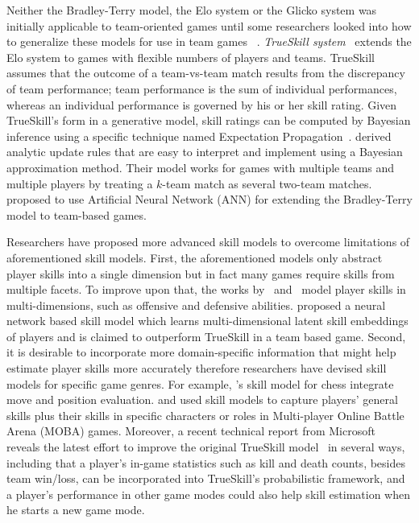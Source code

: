 Neither the Bradley-Terry model, the Elo system or the Glicko system was initially applicable to team-oriented games until some researchers looked into how to generalize these models for use in team games ~\citep{herbrich:trueskill,huang2004generalized,menke2008bradley}. \textit{TrueSkill system}~\citep{herbrich:trueskill} extends the Elo system to games with flexible numbers of players and teams. TrueSkill assumes that the outcome of a team-vs-team match results from the discrepancy of team performance; team performance is the sum of individual performances, whereas an individual performance is governed by his or her skill rating. Given TrueSkill's form in a generative model, skill ratings can be computed by Bayesian inference using a specific technique named Expectation Propagation~\citep{minka2001expectation}. \textcite{huang2004generalized} derived analytic update rules that are easy to interpret and implement using a Bayesian approximation
method. Their model works for games with multiple teams and multiple players by treating a $k$-team match as several two-team matches. \textcite{menke2008bradley} proposed to use Artificial Neural Network (ANN) for extending the Bradley-Terry model to team-based games.

Researchers have proposed more advanced skill models to overcome  limitations of aforementioned skill models. First, the aforementioned models only abstract player skills into a single dimension but in fact many games require skills from multiple facets. To improve upon that, the works by~\textcite{chen2016modeling} and~\textcite{stanescu2011rating} model player skills in multi-dimensions, such as offensive and defensive abilities. \textcite{Delalleau2012} proposed a neural network based skill model which learns multi-dimensional latent skill embeddings of players and is claimed to outperform TrueSkill in a team based game. Second, it is desirable to incorporate more domain-specific information that might help estimate player skills more accurately therefore researchers have devised skill models for specific game genres. For example,  \textcite{di2009skill}'s skill model for chess integrate move and position evaluation. \textcite{zhengxing2016player} and \textcite{suznjevic2015application} used skill models to capture players' general skills plus their skills in specific characters or roles in Multi-player Online Battle Arena (MOBA) games. Moreover, a recent technical report from Microsoft~\citep{trueskill2} reveals the latest effort to improve the original TrueSkill model~\citep{herbrich:trueskill} in several ways, including that a player's in-game statistics such as kill and death counts, besides team win/loss, can be incorporated into TrueSkill's probabilistic framework, and a player's performance in other game modes could also help skill estimation when he starts a new game mode.



